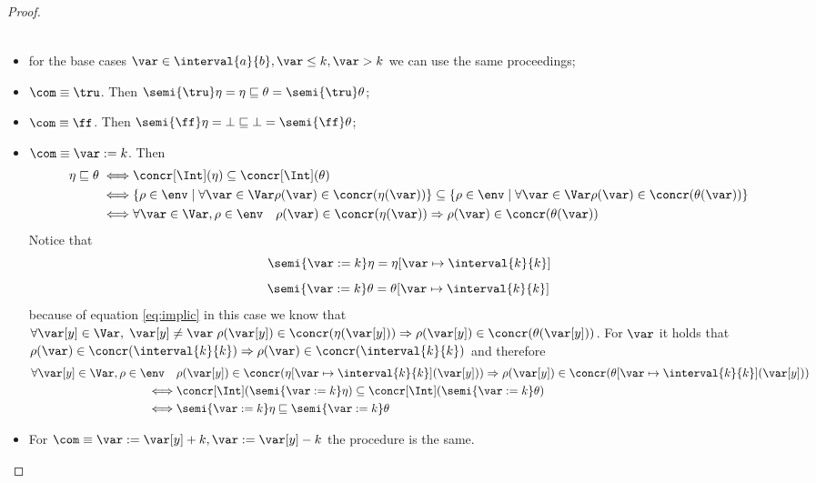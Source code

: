 \begin{proof}
\begin{itemize}
\begin{align*}
    \end{align*}
  \item for the base cases \(\var \in \interval{a}{b}, \var \leq k,
    \var > k\) we can use the same proceedings;
  \item \(\com \equiv \tru\). Then \(\semi{\tru}\eta = \eta
    \sqsubseteq \theta = \semi{\tru}\theta\);
  \item \(\com \equiv \ff\). Then \(\semi{\ff}\eta = \bot \sqsubseteq
    \bot = \semi{\ff}\theta\);
  \item \(\com \equiv \var := k\). Then
    \begin{align}\label{eq:implic}
      \begin{split}
        \eta \sqsubseteq \theta \iff & \concr[\Int](\eta) \subseteq \concr[\Int](\theta) \\
        \iff & \{\rho\in\env \mid \forall \var \in \Var \rho(\var) \in \concr(\eta(\var))\} \subseteq \{\rho\in\env \mid \forall \var \in \Var \rho(\var) \in \concr(\theta(\var))\} \\
        \iff & \forall \var \in \Var, \rho \in \env \quad \rho(\var) \in \concr(\eta(\var)) \Rightarrow \rho(\var) \in \concr(\theta(\var)) \\
      \end{split}
    \end{align}
    Notice that \[\semi{\var := k}\eta =
    \eta[\var\mapsto\interval{k}{k}]\] \[\semi{\var := k}\theta =
    \theta[\var\mapsto\interval{k}{k}]\] because of equation
    \ref{eq:implic} in this case we know that \(\forall \var[y]\in\Var
    ,\; \var[y] \neq \var \; \rho(\var[y]) \in \concr(\eta(\var[y]))
    \Rightarrow \rho(\var[y]) \in \concr(\theta(\var[y]))\). For
    \(\var\) it holds that \(\rho(\var) \in \concr(\interval{k}{k})
    \Rightarrow \rho(\var) \in \concr(\interval{k}{k})\) and therefore
    \begin{align*}
      \forall \var[y] \in \Var, \rho \in \env \quad & \rho(\var[y]) \in \concr(\eta[\var\mapsto\interval{k}{k}](\var[y])) \Rightarrow \rho(\var[y]) \in \concr(\theta[\var\mapsto\interval{k}{k}](\var[y])) \\
      \iff & \concr[\Int](\semi{\var:=k}\eta) \subseteq \concr[\Int](\semi{\var:=k}\theta) \\
      \iff & \semi{\var :=k}\eta \sqsubseteq \semi{\var := k}\theta
    \end{align*}
  \item For \(\com \equiv \var := \var[y] + k, \var := \var[y] - k\)
    the procedure is the same.
  \end{itemize}


\end{proof}
